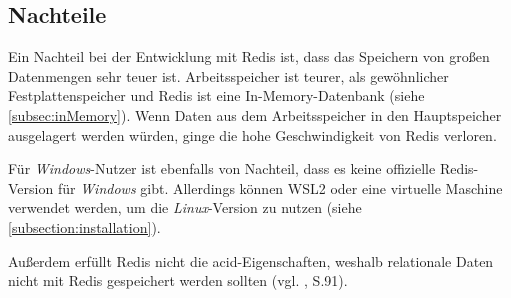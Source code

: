 
\subsection{Nachteile}

Ein Nachteil bei der Entwicklung mit \ac{Redis} ist, dass das Speichern von großen Datenmengen sehr teuer ist. Arbeitsspeicher ist teurer, als gewöhnlicher Festplattenspeicher und \ac{Redis} ist eine In-Memory-Datenbank (siehe \autoref{subsec:inMemory}). Wenn Daten aus dem Arbeitsspeicher in den Hauptspeicher ausgelagert werden würden, ginge die hohe Geschwindigkeit von \ac{Redis} verloren. 

Für \textit{Windows}-Nutzer ist ebenfalls von Nachteil, dass es keine offizielle \ac{Redis}-Version für \textit{Windows} gibt. Allerdings können \ac{WSL2} oder eine virtuelle Maschine verwendet werden, um die \textit{Linux}-Version zu nutzen (siehe \autoref{subsection:installation}).

Außerdem erfüllt \ac{Redis} nicht die \gls{acid}-Eigenschaften, weshalb relationale Daten nicht mit \ac{Redis} gespeichert werden sollten (vgl. \cite{nosql}, S.91).